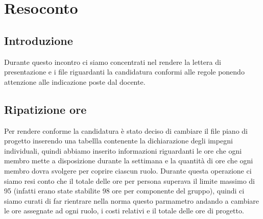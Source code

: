 \section{Resoconto}
\subsection{Introduzione}
Durante questo incontro ci siamo concentrati nel rendere la lettera di presentazione e i file riguardanti la candidatura conformi alle regole ponendo attenzione alle indicazione poste dal docente. 

\subsection{Ripatizione ore}
Per rendere conforme la candidatura è stato deciso di cambiare il file piano di progetto inserendo una tabellla contenente la dichiarazione degli impegni individuali, quindi abbiamo inserito informazioni riguardanti le ore che ogni membro mette a disposizione durante la settimana e la quantità di ore che ogni membro dovra svolgere per coprire ciascun ruolo. Durante questa operazione ci siamo resi conto che il totale delle ore per persona superava il limite massimo di 95 (infatti erano state stabilite 98 ore per componente del gruppo), quindi ci siamo curati di far rientrare nella norma questo parmametro andando a cambiare le ore assegnate ad ogni ruolo, i costi relativi e il totale delle ore di progetto. 


